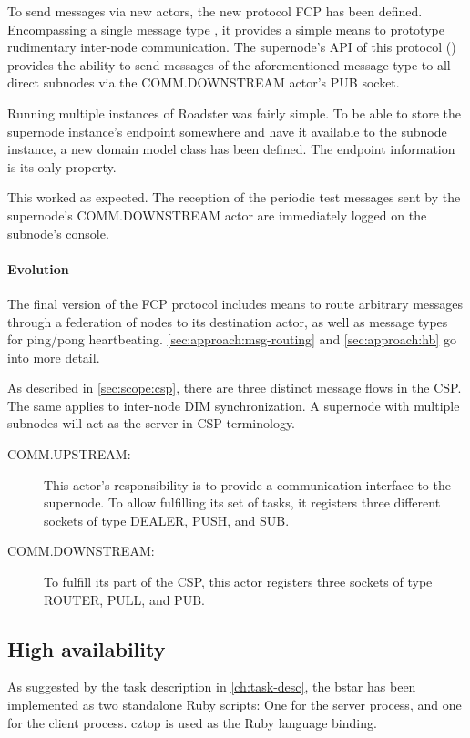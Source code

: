 To send messages via new actors, the new protocol \gls{FCP} has been defined.
Encompassing a single message type , it provides a
simple means to prototype rudimentary inter-node communication. The supernode's
API of this protocol () provides
the ability to send messages of the aforementioned message type to all direct
subnodes via the COMM.DOWNSTREAM actor's PUB \zmq socket.

Running multiple instances of Roadster was fairly simple.
To be able to store the supernode instance's \zmq endpoint somewhere and have
it available to the subnode instance, a new domain model class
 has been defined. The endpoint information
is its only property.

This worked as expected. The reception of the periodic test messages sent by
the supernode's COMM.DOWNSTREAM actor are immediately logged on the subnode's
console.

\paragraph{Evolution} The final version of the FCP protocol includes means to route arbitrary
messages through a federation of nodes to its destination actor, as well as
message types for ping/pong heartbeating. \autoref{sec:approach:msg-routing}
and \autoref{sec:approach:hb} go into more detail.

As described in \autoref{sec:scope:csp}, there are three distinct message flows
in the \gls{CSP}. The same applies to inter-node DIM synchronization. A
supernode with multiple subnodes will act as the server in CSP terminology.

\begin{description}
	\item [COMM.UPSTREAM:]
		This actor's responsibility is to provide a communication
		interface to the supernode. To allow fulfilling its set of
		tasks, it registers three different sockets of type
		DEALER, PUSH, and SUB.

	\item [COMM.DOWNSTREAM:]
		To fulfill its part of the CSP, this actor registers
		three sockets of type ROUTER, PULL, and PUB.
\end{description}


\subsection{High availability}
As suggested by the task description in \autoref{ch:task-desc}, the
\gls{bstar} has been implemented as two standalone Ruby scripts: One for the
server process, and one for the client process. \gls{cztop} is used as the \zmq
Ruby language binding.

